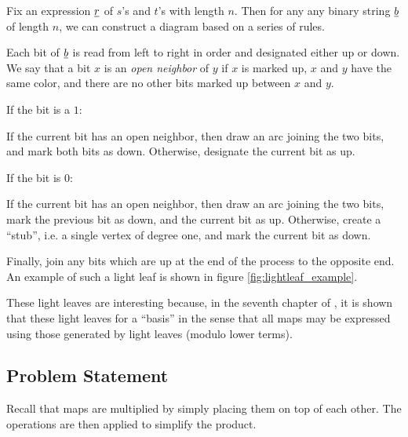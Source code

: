 Fix an expression $\underline{r}$ of $s$'s and $t$'s with length $n$.  Then for any any binary string $\underline{b}$ of length $n$, we can construct a diagram based on a series of rules.

Each bit of $\underline{b}$ is read from left to right in order and designated either up or down.  We say that a bit $x$ is an \emph{open neighbor} of $y$ if $x$ is marked up, $x$ and $y$ have the same color, and there are no other bits marked up between $x$ and $y$.
\begin{itemize}
	\ii If the bit is a $1$:
	\begin{itemize}
		\ii If the current bit has an open neighbor, then draw an arc joining the two bits, and mark both bits as down.
		\ii Otherwise, designate the current bit as up.
	\end{itemize}
	\ii If the bit is $0$:
	\begin{itemize}
		\ii If the current bit has an open neighbor, then draw an arc joining the two bits, mark the previous bit as down, and the current bit as up.
		\ii Otherwise, create a ``stub'', i.e. a single vertex of degree one, and mark the current bit as down.
	\end{itemize}
\end{itemize}
Finally, join any bits which are up at the end of the process to the opposite end.  An example of such a light leaf is shown in figure \ref{fig:lightleaf_example}.

These light leaves are interesting because, in the seventh chapter of \cite{span}, it is shown that these light leaves for a ``basis'' in the sense that all maps may be expressed using those generated by light leaves (modulo lower terms).

\subsection{Problem Statement}
\label{sec:prelim_probstate}
Recall that maps are multiplied by simply placing them on top of each other.  The operations are then applied to simplify the product.

